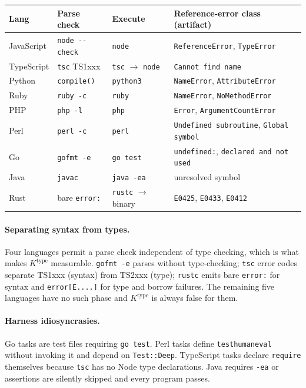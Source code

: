 \begin{table}[H]
\centering\small
\begin{tabular}{lllp{5.2cm}}
\toprule
Lang & Parse check & Execute & Reference-error class (artifact) \\
\midrule
JavaScript & \texttt{node -{}-check} & \texttt{node} & \texttt{ReferenceError}, \texttt{TypeError} \\
TypeScript & \texttt{tsc} TS1xxx & \texttt{tsc} $\rightarrow$ \texttt{node} & \texttt{Cannot find name} \\
Python & \texttt{compile()} & \texttt{python3} & \texttt{NameError}, \texttt{AttributeError} \\
Ruby & \texttt{ruby -c} & \texttt{ruby} & \texttt{NameError}, \texttt{NoMethodError} \\
PHP & \texttt{php -l} & \texttt{php} & \texttt{Error}, \texttt{ArgumentCountError} \\
Perl & \texttt{perl -c} & \texttt{perl} & \texttt{Undefined subroutine}, \texttt{Global symbol} \\
Go & \texttt{gofmt -e} & \texttt{go test} & \texttt{undefined:}, \texttt{declared and not used} \\
Java & \texttt{javac} & \texttt{java -ea} & unresolved symbol \\
Rust & bare \texttt{error:} & \texttt{rustc} $\rightarrow$ binary & \texttt{E0425}, \texttt{E0433}, \texttt{E0412} \\
\bottomrule
\end{tabular}
\end{table}

\paragraph{Separating syntax from types.} Four languages permit a parse check independent of type
checking, which is what makes $K^{\mathrm{type}}$ measurable. \texttt{gofmt -e} parses without
type-checking; \texttt{tsc} error codes separate TS1xxx (syntax) from TS2xxx (type); \texttt{rustc}
emits bare \texttt{error:} for syntax and \texttt{error[E....]} for type and borrow failures. The
remaining five languages have no such phase and $K^{\mathrm{type}}$ is always false for them.

\paragraph{Harness idiosyncrasies.} Go tasks are test files requiring \texttt{go test}. Perl tasks
define \texttt{testhumaneval} without invoking it and depend on \texttt{Test::Deep}. TypeScript tasks
declare \texttt{require} themselves because \texttt{tsc} has no Node type declarations. Java requires
\texttt{-ea} or assertions are silently skipped and every program passes.

